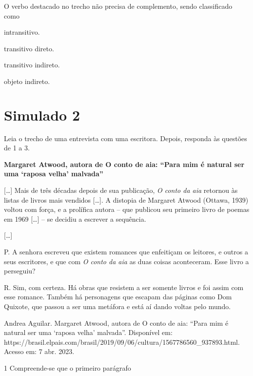 O verbo destacado no trecho não precisa de complemento, sendo
classificado como

\begin{escolha}
\item intransitivo.

\item transitivo direto.

\item transitivo indireto.

\item objeto indireto.
\end{escolha}

\chapter{Simulado 2}

Leia o trecho de uma entrevista com uma escritora. Depois, responda às
questões de 1 a 3.

\textbf{Margaret Atwood, autora de O conto de aia: ``Para mim é natural
ser uma `raposa velha' malvada''}

{[}\ldots{}{]} Mais de três décadas depois de sua publicação, \emph{O
conto da aia} retornou às listas de livros mais vendidos {[}\ldots{}{]}.
A distopia de Margaret Atwood (Ottawa, 1939) voltou com força, e a
prolífica autora -- que publicou seu primeiro livro de poemas em 1969
{[}\ldots{}{]} -- se decidiu a escrever a sequência.

{[}\ldots{}{]}

P. A senhora escreveu que existem romances que enfeitiçam os leitores, e
outros a seus escritores, e que com \emph{O conto da aia} as duas coisas
aconteceram. Esse livro a perseguiu?

R. Sim, com certeza. Há obras que resistem a ser somente livros e foi
assim com esse romance. Também há personagens que escapam das páginas
como Dom Quixote, que passou a ser uma metáfora e está aí dando voltas
pelo mundo.

Andrea Aguilar. Margaret Atwood, autora de O conto de aia: ``Para mim é
natural ser uma `raposa velha' malvada''. Disponível em:
https://brasil.elpais.com/brasil/2019/09/06/cultura/1567786560\_937893.html.
Acesso em: 7 abr. 2023.

\num{1} Compreende-se que o primeiro parágrafo


